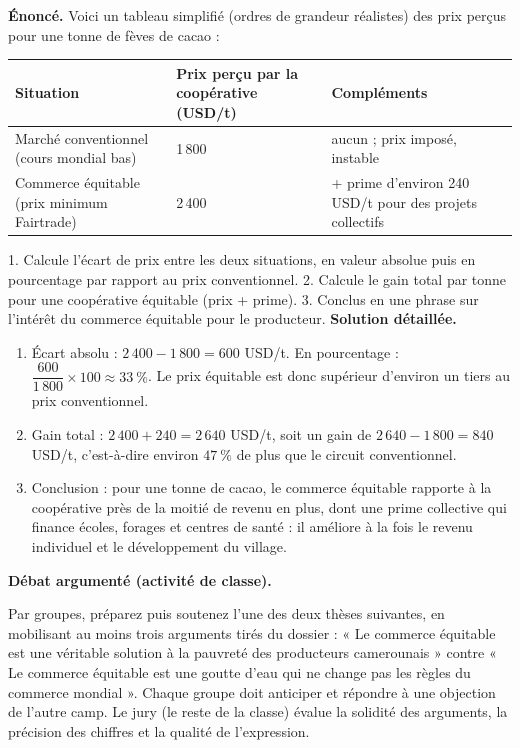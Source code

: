 \documentclass[11pt]{article}
\begin{document}
\begin{exoresolu}
\textbf{Énoncé.} Voici un tableau simplifié (ordres de grandeur réalistes) des prix perçus pour une tonne de fèves de cacao :

\begin{center}
\begin{tabularx}{\linewidth}{|l|X|X|}\hline
\rowcolor{popblueL}
\textbf{Situation} & \textbf{Prix perçu par la coopérative (USD/t)} & \textbf{Compléments} \\ \hline
Marché conventionnel (cours mondial bas) & 1\,800 & aucun ; prix imposé, instable \\ \hline
Commerce équitable (prix minimum Fairtrade) & 2\,400 & + prime d'environ 240 USD/t pour des projets collectifs \\ \hline
\end{tabularx}
\end{center}

1. Calcule l'écart de prix entre les deux situations, en valeur absolue puis en pourcentage par rapport au prix conventionnel.
2. Calcule le gain total par tonne pour une coopérative équitable (prix + prime).
3. Conclus en une phrase sur l'intérêt du commerce équitable pour le producteur.
\tcblower
\textbf{Solution détaillée.}
\begin{enumerate}
\item Écart absolu : $2\,400 - 1\,800 = 600$ USD/t. En pourcentage : $\dfrac{600}{1\,800} \times 100 \approx 33~\%$. Le prix équitable est donc supérieur d'environ un tiers au prix conventionnel.
\item Gain total : $2\,400 + 240 = 2\,640$ USD/t, soit un gain de $2\,640 - 1\,800 = 840$ USD/t, c'est-à-dire environ $47~\%$ de plus que le circuit conventionnel.
\item Conclusion : pour une tonne de cacao, le commerce équitable rapporte à la coopérative près de la moitié de revenu en plus, dont une prime collective qui finance écoles, forages et centres de santé : il améliore à la fois le revenu individuel et le développement du village.
\end{enumerate}
\end{exoresolu}

\textbf{Débat argumenté (activité de classe).}\par
Par groupes, préparez puis soutenez l'une des deux thèses suivantes, en mobilisant au moins trois arguments tirés du dossier : « Le commerce équitable est une véritable solution à la pauvreté des producteurs camerounais » contre « Le commerce équitable est une goutte d'eau qui ne change pas les règles du commerce mondial ». Chaque groupe doit anticiper et répondre à une objection de l'autre camp. Le jury (le reste de la classe) évalue la solidité des arguments, la précision des chiffres et la qualité de l'expression.
\end{document}
